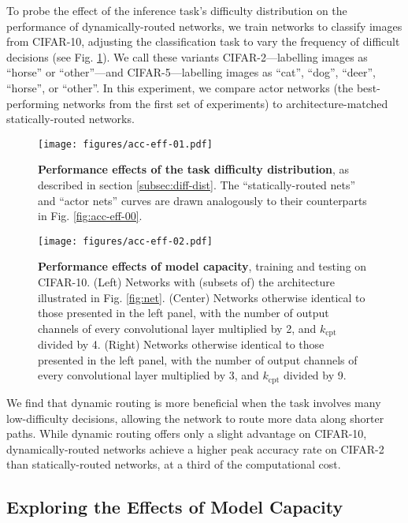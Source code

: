 \documentclass{article}
\begin{document}
  To probe the effect of the inference task's difficulty distribution on the performance of dynamically-routed networks, we train networks to classify images from CIFAR-10, adjusting the classification task to vary the frequency of difficult decisions (see Fig. \ref*{fig:acc-eff-01}). We call these variants CIFAR-2---labelling images as ``horse'' or ``other''---and CIFAR-5---labelling images  as ``cat'', ``dog'', ``deer'', ``horse'', or ``other''. In this experiment, we compare actor networks (the best-performing networks from the first set of experiments) to architecture-matched statically-routed networks.
 
  \begin{figure}[htb]
    \centering
    \texttt{[image: figures/acc-eff-01.pdf]}
    \caption{\textbf{Performance effects of the task difficulty distribution}, as described in section \ref*{subsec:diff-dist}. The ``statically-routed nets'' and ``actor nets'' curves are drawn analogously to their counterparts in Fig. \ref*{fig:acc-eff-00}.}
    \label{fig:acc-eff-01}
  \end{figure}

  \begin{figure}[htb]
    \centering
    \texttt{[image: figures/acc-eff-02.pdf]}
    \caption{\textbf{Performance effects of model capacity}, training and testing on CIFAR-10. (Left) Networks with (subsets of) the architecture illustrated in Fig. \ref*{fig:net}. (Center) Networks otherwise identical to those presented in the left panel, with the number of output channels of every convolutional layer multiplied by 2, and $k_\text{cpt}$ divided by 4. (Right) Networks otherwise identical to those presented in the left panel, with the number of output channels of every convolutional layer multiplied by 3, and $k_\text{cpt}$ divided by 9.}
    \label{fig:acc-eff-02}
  \end{figure}
 
  We find that dynamic routing is more beneficial when the task involves many low-difficulty decisions, allowing the network to route more data along shorter paths. While dynamic routing offers only a slight advantage on CIFAR-10, dynamically-routed networks achieve a higher peak accuracy rate on CIFAR-2 than statically-routed networks, at a third of the computational cost.

  \subsection{Exploring the Effects of Model Capacity}
  
\end{document}
